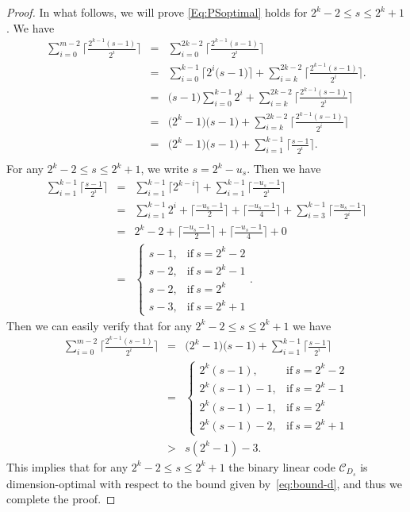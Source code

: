 \documentclass[10pt]{article}
\newcommand{\0}{\textbf{0}}
\newcommand{\1}{\textbf{1}}
\newcommand{\C}{{\mathcal C}}
\begin{document}
{\begin{proof}
In what follows, we will prove \eqref{Eq:PSoptimal} holds for  $2^k-2\leq s\leq 2^k+1$.
We have
\begin{eqnarray*}
\sum_{i=0}^{m-2}\bigg\lceil\frac{2^{k-1}(s-1)}{2^i}\bigg\rceil &=&\sum_{i=0}^{2k-2}\bigg\lceil\frac{2^{k-1}(s-1)}{2^i}\bigg\rceil\\
&=&\sum_{i=0}^{k-1}\Big\lceil2^i\big(s-1\big)\Big\rceil+\sum_{i=k}^{2k-2}\bigg\lceil\frac{2^{k-1}(s-1)}{2^i}\bigg\rceil.\\
&=&\big(s-1\big)\sum_{i=0}^{k-1}2^i+\sum_{i=k}^{2k-2}\bigg\lceil\frac{2^{k-1}(s-1)}{2^i}\bigg\rceil\\
&=&\big(2^k-1)\big(s-1\big)+\sum_{i=k}^{2k-2}\bigg\lceil\frac{2^{k-1}(s-1)}{2^i}\bigg\rceil\\
&=&\big(2^k-1)\big(s-1\big)+\sum_{i=1}^{k-1}\bigg\lceil\frac{s-1}{2^i}\bigg\rceil.\\
\end{eqnarray*}
For any $2^k-2\leq s\leq 2^k+1$, we write $s=2^k-u_s$. Then we have
\begin{eqnarray*}
\sum_{i=1}^{k-1}\bigg\lceil\frac{s-1}{2^i}\bigg\rceil&=&\sum_{i=1}^{k-1}\bigg\lceil2^{k-i}\bigg\rceil+\sum_{i=1}^{k-1}\bigg\lceil\frac{-u_s-1}{2^i}\bigg\rceil\\
&=&\sum_{i=1}^{k-1}2^i+\bigg\lceil\frac{-u_s-1}{2}\bigg\rceil+\bigg\lceil\frac{-u_s-1}{4}\bigg\rceil+\sum_{i=3}^{k-1}\bigg\lceil\frac{-u_s-1}{2^i}\bigg\rceil\\
&=&2^k-2+\bigg\lceil\frac{-u_s-1}{2}\bigg\rceil+\bigg\lceil\frac{-u_s-1}{4}\bigg\rceil+0\\
&=& \left\{
\begin{array}{llllll}
s-1,&\mathrm{if~}s=2^k-2\\
s-2,&\mathrm{if~}s=2^k-1\\
s-2,&\mathrm{if~}s=2^k\\
s-3,&\mathrm{if~}s=2^k+1
\end{array}
\right..
\end{eqnarray*}
Then we can easily verify that for any $2^k-2\leq s\leq 2^k+1$ we have
\begin{eqnarray*}
\sum_{i=0}^{m-2}\bigg\lceil\frac{2^{k-1}(s-1)}{2^i}\bigg\rceil &=&\big(2^k-1)\big(s-1\big)+\sum_{i=1}^{k-1}\bigg\lceil\frac{s-1}{2^i}\bigg\rceil\\
&=&\left\{
\begin{array}{llllll}
2^k(s-1),&\mathrm{if~}s=2^k-2\\
2^k(s-1)-1,&\mathrm{if~}s=2^k-1\\
2^k(s-1)-1,&\mathrm{if~}s=2^k\\
2^k(s-1)-2,&\mathrm{if~}s=2^k+1
\end{array}
\right.\\
&>& s(2^k-1)-3.
\end{eqnarray*}
This implies that for any $2^k-2\leq s\leq 2^k+1$ the binary linear code $\C_{D_s}$  is dimension-optimal with respect to the bound given by~\eqref{eq:bound-d}, and
thus we complete the proof.
\end{proof}

}
\end{document}
